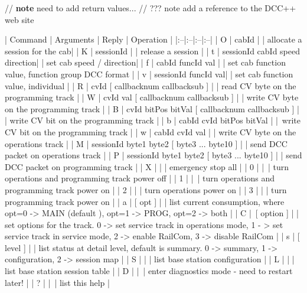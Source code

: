 
// \textbf{note} need to add return values...
// ??? note add a reference to the DCC++ web site

| Command | Arguments | Reply | Operation |
|:--|:--|:--|:--|
| O | cabId | | allocate a session for the cab|
| K | sessionId | | release a session |
| t | sessionId cabId speed direction| | set cab speed / direction|
| f | cabId funcId val | | set cab function value, function group DCC format |
| v | sessionId funcId val| | set cab function value, individual |
| R | cvId [ callbacknum callbacksub ] | | read CV byte on the programming track |
| W | cvId val [ callbacknum callbacksub ] | | write CV byte on the programming track |
| B | cvId bitPos bitVal [ callbacknum callbacksub ] | | write CV bit on the programming track |
| b | cabId cvId bitPos bitVal | | write CV bit on the programming track |
| w | cabId cvId val | | write CV byte on the operations track |
| M | sessionId byte1 byte2 [ byte3 ... byte10 ] | | send DCC packet on operations track |
| P | sessionId byte1 byte2 [ byte3 ... byte10 ] | | send DCC packet on programming track |
| X | | | emergency stop all |
| 0 | | | turn operations and programming track power off |
| 1 | | | turn operations and programming track power on |
| 2 | | | turn operations power on |
| 3 | | | turn programming track power on |
| a | [ opt ] | | list current consumption, where opt=0 -> MAIN (default ), opt=1 -> PROG, opt=2 -> both |
| C | [ option ] | | set options for the track. 0 -> set service track in operations mode, 1 - > set service track in service mode, 2 -> enable RailCom, 3 -> disable RailCom |
| s | [ level ] | | list status at detail level, default is summary. 0 -> summary, 1 -> configuration,  2 -> session map |
| S | | | list base station configuration |
| L | | | list base station session table |
| D | | | enter diagnostics mode - need to restart later! |
| ? | | | list this help |
